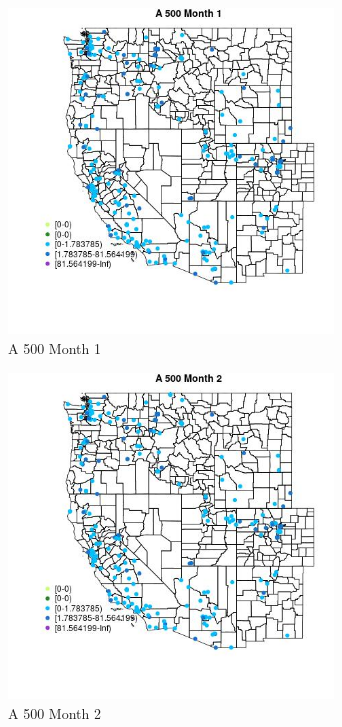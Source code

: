 \begin{figure} 
\centering  
\includegraphics[width=0.77\textwidth]{Code_Outputs/Report_ML_input_PM25_Step4_part_e_de_duplicated_aveswNAs_MapObsMo1A_500.jpg} 
\caption{\label{fig:Report_ML_input_PM25_Step4_part_e_de_duplicated_aveswNAsMapObsMo1A_500}A 500 Month 1} 
\end{figure} 
 

\begin{figure} 
\centering  
\includegraphics[width=0.77\textwidth]{Code_Outputs/Report_ML_input_PM25_Step4_part_e_de_duplicated_aveswNAs_MapObsMo2A_500.jpg} 
\caption{\label{fig:Report_ML_input_PM25_Step4_part_e_de_duplicated_aveswNAsMapObsMo2A_500}A 500 Month 2} 
\end{figure} 
 

